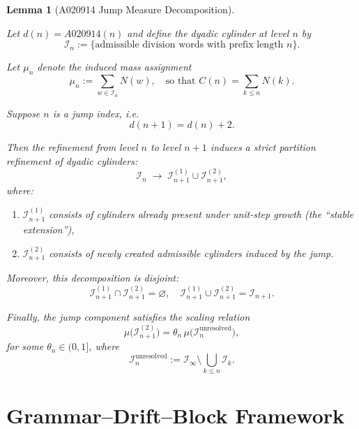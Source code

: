 \documentclass[12pt, oneside]{article}
\numberwithin{equation}{section}
\theoremstyle{definition}
\theoremstyle{plain}
\newtheorem{lemma}[theorem]{Lemma}
\theoremstyle{remark}
\begin{document}
\begin{lemma}[A020914 Jump Measure Decomposition]
\label{lem:a020914-measure-decomp}

Let $d(n)=A020914(n)$ and define the dyadic cylinder at level $n$ by
\[
\mathcal{I}_n := \{ \text{admissible division words with prefix length } n \}.
\]

Let $\mu_n$ denote the induced mass assignment
\[
\mu_n := \sum_{w \in \mathcal{I}_n} N(w),
\quad \text{so that } C(n)=\sum_{k\le n} N(k).
\]

Suppose $n$ is a jump index, i.e.
\[
d(n+1)=d(n)+2.
\]

Then the refinement from level $n$ to level $n+1$ induces a
strict partition refinement of dyadic cylinders:
\[
\mathcal{I}_n \;\longrightarrow\; \mathcal{I}_{n+1}^{(1)} \cup \mathcal{I}_{n+1}^{(2)},
\]
where:

\begin{enumerate}
\item $\mathcal{I}_{n+1}^{(1)}$ consists of cylinders already present under unit-step growth (the “stable extension”),
\item $\mathcal{I}_{n+1}^{(2)}$ consists of newly created admissible cylinders induced by the jump.
\end{enumerate}

Moreover, this decomposition is disjoint:
\[
\mathcal{I}_{n+1}^{(1)} \cap \mathcal{I}_{n+1}^{(2)} = \varnothing,
\quad
\mathcal{I}_{n+1}^{(1)} \cup \mathcal{I}_{n+1}^{(2)} = \mathcal{I}_{n+1}.
\]

Finally, the jump component satisfies the scaling relation
\[
\mu\big(\mathcal{I}_{n+1}^{(2)}\big)
=
\theta_n \, \mu\big(\mathcal{I}_n^{\mathrm{unresolved}}\big),
\]
for some $\theta_n \in (0,1]$, where
\[
\mathcal{I}_n^{\mathrm{unresolved}} := \mathcal{I}_{\infty} \setminus \bigcup_{k\le n} \mathcal{I}_k.
\]

\end{lemma}

\section{Grammar–Drift–Block Framework}
\label{sec:grammar-drift-block}
\end{document}
